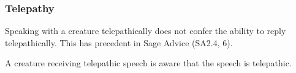 \documentclass[letterpaper,twocolumn,openany,nodeprecatedcode]{dndbook}
\begin{document}
\subsubsection{Telepathy}
Speaking with a creature telepathically does not confer the ability to reply telepathically. This has precedent in Sage Advice (SA2.4, 6).

A creature receiving telepathic speech is aware that the speech is telepathic.






\end{document}

